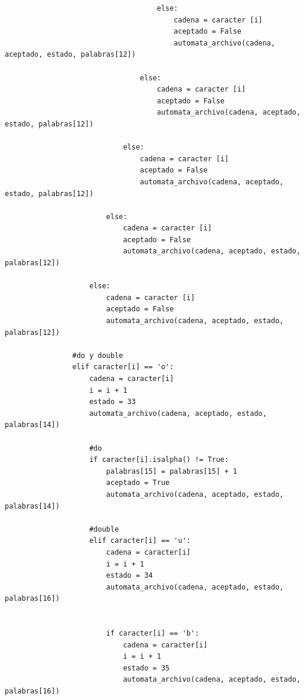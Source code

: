 \documentclass{article}
\begin{document}
\begin{flushleft}
\begin{lstlisting}
                                    else:
                                        cadena = caracter [i]
                                        aceptado = False
                                        automata_archivo(cadena, aceptado, estado, palabras[12])
                                        
                                else:
                                    cadena = caracter [i]
                                    aceptado = False
                                    automata_archivo(cadena, aceptado, estado, palabras[12])
                                    
                            else:
                                cadena = caracter [i]
                                aceptado = False
                                automata_archivo(cadena, aceptado, estado, palabras[12])
                                
                        else:
                            cadena = caracter [i]
                            aceptado = False
                            automata_archivo(cadena, aceptado, estado, palabras[12])
                            
                    else:
                        cadena = caracter [i]
                        aceptado = False
                        automata_archivo(cadena, aceptado, estado, palabras[12])
                        
                #do y double
                elif caracter[i] == 'o':
                    cadena = caracter[i]
                    i = i + 1
                    estado = 33
                    automata_archivo(cadena, aceptado, estado, palabras[14])
                    
                    #do
                    if caracter[i].isalpha() != True:
                        palabras[15] = palabras[15] + 1
                        aceptado = True
                        automata_archivo(cadena, aceptado, estado, palabras[14])
                        
                    #double
                    elif caracter[i] == 'u':
                        cadena = caracter[i]
                        i = i + 1
                        estado = 34
                        automata_archivo(cadena, aceptado, estado, palabras[16])
                    

                        if caracter[i] == 'b':
                            cadena = caracter[i]
                            i = i + 1
                            estado = 35
                            automata_archivo(cadena, aceptado, estado, palabras[16])
                            

\end{lstlisting}
\end{flushleft}
\end{document}
